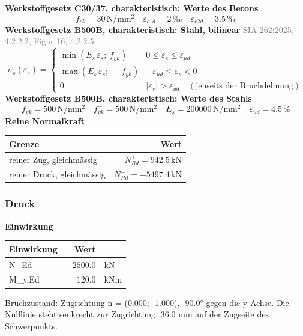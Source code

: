 \documentclass[11pt,a4paper]{article}
\newcommand{\normref}[1]{{\small\textcolor{gray}{#1}}}
\begin{document}
\noindent\textbf{Werkstoffgesetz C30/37, charakteristisch: Werte des Betons}
\begin{equation*}
f_{ck} = 30\,\mathrm{N}/\mathrm{mm}^{2} \quad \varepsilon_{c1d} = 2\,\text{‰} \quad \varepsilon_{c2d} = 3.5\,\text{‰}
\end{equation*}
\noindent\textbf{Werkstoffgesetz B500B, charakteristisch: Stahl, bilinear} \hfill \normref{SIA 262:2025, 4.2.2.2, Figur 16; 4.2.2.5}
\begin{equation*}
\sigma_s(\varepsilon_s) = \begin{cases} \min(E_s\,\varepsilon_s;\ f_{yk}) & 0 \le \varepsilon_s \le \varepsilon_{ud} \\[1ex] \max(E_s\,\varepsilon_s;\ -f_{yk}^{-}) & -\varepsilon_{ud} \le \varepsilon_s < 0 \\[1ex] 0 & |\varepsilon_s| > \varepsilon_{ud} \quad (\text{jenseits der Bruchdehnung}) \end{cases}
\end{equation*}
\noindent\textbf{Werkstoffgesetz B500B, charakteristisch: Werte des Stahls}
\begin{equation*}
f_{yk} = 500\,\mathrm{N}/\mathrm{mm}^{2} \quad f_{yk}^{-} = 500\,\mathrm{N}/\mathrm{mm}^{2} \quad E_s = 200000\,\mathrm{N}/\mathrm{mm}^{2} \quad \varepsilon_{ud} = 4.5\,\%
\end{equation*}
\noindent\textbf{Reine Normalkraft}
\begin{longtable}{lr}
\hline
Grenze & Wert \\
\hline
\endhead
reiner Zug, gleichmässig & $N_{Rd}^{+} = 942.5\,\mathrm{kN}$ \\
reiner Druck, gleichmässig & $N_{Rd}^{-} = -5497.4\,\mathrm{kN}$ \\
\hline
\end{longtable}
\subsubsection{Druck}
\noindent\textbf{Einwirkung}
\begin{longtable}{lrl}
\hline
Einwirkung & Wert &  \\
\hline
\endhead
N\_Ed & $-2500.0$ & kN \\
M\_y,Ed & $120.0$ & kNm \\
\hline
\end{longtable}
Bruchzustand: Zugrichtung n = (0.000; -1.000), -90.0° gegen die y-Achse. Die Nulllinie steht senkrecht zur Zugrichtung, 36.0 mm auf der Zugseite des Schwerpunkts.
\end{document}
